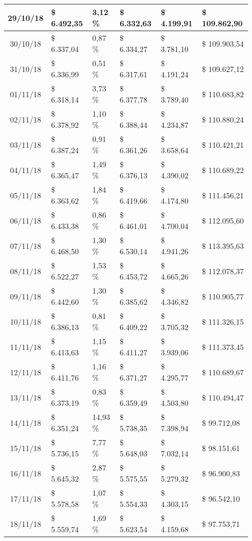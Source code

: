 \begin{small}
\begin{longtable}{|c|l|l|l|l|l|}
29/10/18 & \$ 6.492,35 & 3,12 \% & \$ 6.332,63 & \$ 4.199,91 & \$ 109.862,90 \\ \hline
30/10/18 & \$ 6.337,04 & 0,87 \% & \$ 6.334,27 & \$ 3.781,10 & \$ 109.903,54 \\ \hline
31/10/18 & \$ 6.336,99 & 0,51 \% & \$ 6.317,61 & \$ 4.191,24 & \$ 109.627,12 \\ \hline
01/11/18 & \$ 6.318,14 & 3,73 \% & \$ 6.377,78 & \$ 3.789,40 & \$ 110.683,82 \\ \hline
02/11/18 & \$ 6.378,92 & 1,10 \% & \$ 6.388,44 & \$ 4.234,87 & \$ 110.880,24 \\ \hline
03/11/18 & \$ 6.387,24 & 0,91 \% & \$ 6.361,26 & \$ 3.658,64 & \$ 110.421,21 \\ \hline
04/11/18 & \$ 6.365,47 & 1,49 \% & \$ 6.376,13 & \$ 4.390,02 & \$ 110.689,22 \\ \hline
05/11/18 & \$ 6.363,62 & 1,84 \% & \$ 6.419,66 & \$ 4.174,80 & \$ 111.456,21 \\ \hline
06/11/18 & \$ 6.433,38 & 0,86 \% & \$ 6.461,01 & \$ 4.700,04 & \$ 112.095,60 \\ \hline
07/11/18 & \$ 6.468,50 & 1,30 \% & \$ 6.530,14 & \$ 4.941,26 & \$ 113.395,63 \\ \hline
08/11/18 & \$ 6.522,27 & 1,53 \% & \$ 6.453,72 & \$ 4.665,26 & \$ 112.078,37 \\ \hline
09/11/18 & \$ 6.442,60 & 1,30 \% & \$ 6.385,62 & \$ 4.346,82 & \$ 110.905,77 \\ \hline
10/11/18 & \$ 6.386,13 & 0,81 \% & \$ 6.409,22 & \$ 3.705,32 & \$ 111.326,15 \\ \hline
11/11/18 & \$ 6.413,63 & 1,15 \% & \$ 6.411,27 & \$ 3.939,06 & \$ 111.373,45 \\ \hline
12/11/18 & \$ 6.411,76 & 1,16 \% & \$ 6.371,27 & \$ 4.295,77 & \$ 110.689,67 \\ \hline
13/11/18 & \$ 6.373,19 & 0,83 \% & \$ 6.359,49 & \$ 4.503,80 & \$ 110.494,47 \\ \hline
14/11/18 & \$ 6.351,24 & 14,93 \% & \$ 5.738,35 & \$ 7.398,94 & \$ 99.712,08 \\ \hline
15/11/18 & \$ 5.736,15 & 7,77 \% & \$ 5.648,03 & \$ 7.032,14 & \$ 98.151,61 \\ \hline
16/11/18 & \$ 5.645,32 & 2,87 \% & \$ 5.575,55 & \$ 5.279,32 & \$ 96.900,83 \\ \hline
17/11/18 & \$ 5.578,58 & 1,07 \% & \$ 5.554,33 & \$ 4.303,15 & \$ 96.542,10 \\ \hline
18/11/18 & \$ 5.559,74 & 1,69 \% & \$ 5.623,54 & \$ 4.159,68 & \$ 97.753,71 \\ \hline

\end{longtable}
\end{small}
